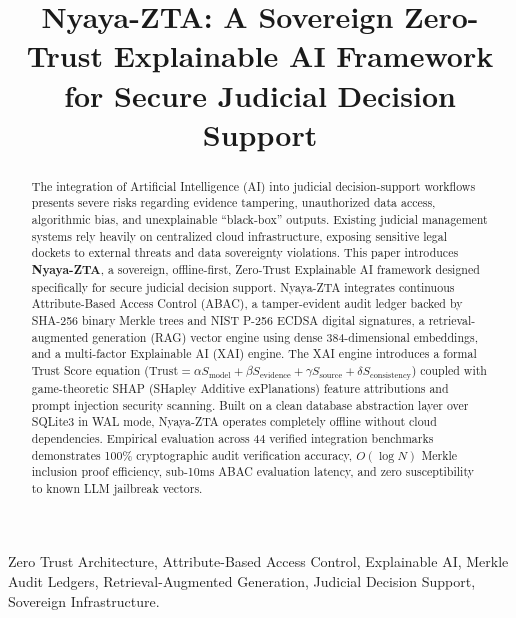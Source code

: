 \documentclass[10pt,conference,two-column]{IEEEtran}
\begin{document}
\title{Nyaya-ZTA: A Sovereign Zero-Trust Explainable AI Framework for Secure Judicial Decision Support}

\author{
}

\maketitle

\begin{abstract}
The integration of Artificial Intelligence (AI) into judicial decision-support workflows presents severe risks regarding evidence tampering, unauthorized data access, algorithmic bias, and unexplainable ``black-box'' outputs. Existing judicial management systems rely heavily on centralized cloud infrastructure, exposing sensitive legal dockets to external threats and data sovereignty violations. This paper introduces \textbf{Nyaya-ZTA}, a sovereign, offline-first, Zero-Trust Explainable AI framework designed specifically for secure judicial decision support. Nyaya-ZTA integrates continuous Attribute-Based Access Control (ABAC), a tamper-evident audit ledger backed by SHA-256 binary Merkle trees and NIST P-256 ECDSA digital signatures, a retrieval-augmented generation (RAG) vector engine using dense 384-dimensional embeddings, and a multi-factor Explainable AI (XAI) engine. The XAI engine introduces a formal Trust Score equation ($\text{Trust} = \alpha S_{\text{model}} + \beta S_{\text{evidence}} + \gamma S_{\text{source}} + \delta S_{\text{consistency}}$) coupled with game-theoretic SHAP (SHapley Additive exPlanations) feature attributions and prompt injection security scanning. Built on a clean database abstraction layer over SQLite3 in WAL mode, Nyaya-ZTA operates completely offline without cloud dependencies. Empirical evaluation across 44 verified integration benchmarks demonstrates 100\% cryptographic audit verification accuracy, $O(\log N)$ Merkle inclusion proof efficiency, sub-10ms ABAC evaluation latency, and zero susceptibility to known LLM jailbreak vectors.
\end{abstract}

\begin{IEEEkeywords}
Zero Trust Architecture, Attribute-Based Access Control, Explainable AI, Merkle Audit Ledgers, Retrieval-Augmented Generation, Judicial Decision Support, Sovereign Infrastructure.
\end{IEEEkeywords}
\end{document}
